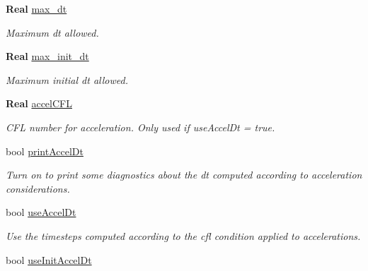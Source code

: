 \begin{DoxyCompactItemize}
\textbf{ Real} \hyperlink{struct_mushy_layer_options_aa10931f3d610f30a954fd28f3dc74df8}{max\+\_\+dt}
\begin{DoxyCompactList}\small\item\em Maximum dt allowed. \end{DoxyCompactList}\item 
\mbox{\label{struct_mushy_layer_options_a1d7da8601808d29f278e4c4ecba43adc}} 
\textbf{ Real} \hyperlink{struct_mushy_layer_options_a1d7da8601808d29f278e4c4ecba43adc}{max\+\_\+init\+\_\+dt}
\begin{DoxyCompactList}\small\item\em Maximum initial dt allowed. \end{DoxyCompactList}\item 
\textbf{ Real} \hyperlink{struct_mushy_layer_options_ab64711234784b285045c7dfb904231f3}{accel\+C\+FL}
\begin{DoxyCompactList}\small\item\em C\+FL number for acceleration. Only used if use\+Accel\+Dt = true. \end{DoxyCompactList}\item 
\mbox{\label{struct_mushy_layer_options_aa61cb83edf273653cb57756730eaa146}} 
bool \hyperlink{struct_mushy_layer_options_aa61cb83edf273653cb57756730eaa146}{print\+Accel\+Dt}
\begin{DoxyCompactList}\small\item\em Turn on to print some diagnostics about the dt computed according to acceleration considerations. \end{DoxyCompactList}\item 
\mbox{\label{struct_mushy_layer_options_af2f4e49cd5728b12ef4b64f1e0a819e5}} 
bool \hyperlink{struct_mushy_layer_options_af2f4e49cd5728b12ef4b64f1e0a819e5}{use\+Accel\+Dt}
\begin{DoxyCompactList}\small\item\em Use the timesteps computed according to the cfl condition applied to accelerations. \end{DoxyCompactList}\item 
\mbox{\label{struct_mushy_layer_options_a5df4bdfad1515e71893b5c54996f3c17}} 
bool \hyperlink{struct_mushy_layer_options_a5df4bdfad1515e71893b5c54996f3c17}{use\+Init\+Accel\+Dt}

\end{DoxyCompactItemize}
